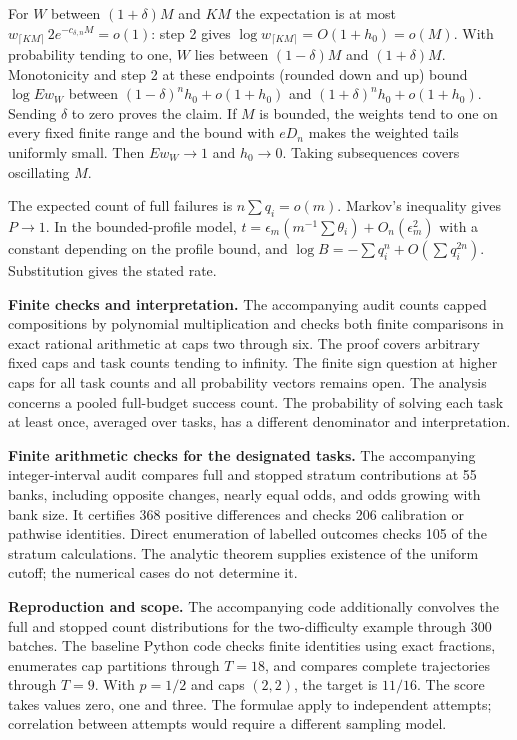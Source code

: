 \documentclass[11pt]{article}
\begin{document}
\newpage
For $W$ between $(1+\delta)M$ and $KM$ the expectation is at most $w_{\lceil KM\rceil}\,2e^{-c_{\delta,n}M}=o(1)$: step 2 gives $\log w_{\lceil KM\rceil}=O(1+h_0)=o(M)$. With probability tending to one, $W$ lies between $(1-\delta)M$ and $(1+\delta)M$. Monotonicity and step 2 at these endpoints (rounded down and up) bound $\log Ew_W$ between $(1-\delta)^n h_0+o(1+h_0)$ and $(1+\delta)^n h_0+o(1+h_0)$. Sending $\delta$ to zero proves the claim. If $M$ is bounded, the weights tend to one on every fixed finite range and the bound with $eD_n$ makes the weighted tails uniformly small. Then $Ew_W\to1$ and $h_0\to0$. Taking subsequences covers oscillating $M$.

The expected count of full failures is $n\sum q_i=o(m)$. Markov's inequality gives $P\to1$. In the bounded-profile model, $t=\epsilon_m(m^{-1}\sum\theta_i)+O_n(\epsilon_m^2)$ with a constant depending on the profile bound, and $\log B=-\sum q_i^n+O(\sum q_i^{2n})$. Substitution gives the stated rate.

\textbf{Finite checks and interpretation.} The accompanying audit counts capped compositions by polynomial multiplication and checks both finite comparisons in exact rational arithmetic at caps two through six. The proof covers arbitrary fixed caps and task counts tending to infinity. The finite sign question at higher caps for all task counts and all probability vectors remains open. The analysis concerns a pooled full-budget success count. The probability of solving each task at least once, averaged over tasks, has a different denominator and interpretation.



\textbf{Finite arithmetic checks for the designated tasks.} The accompanying integer-interval audit compares full and stopped stratum contributions at 55 banks, including opposite changes, nearly equal odds, and odds growing with bank size. It certifies 368 positive differences and checks 206 calibration or pathwise identities. Direct enumeration of labelled outcomes checks 105 of the stratum calculations. The analytic theorem supplies existence of the uniform cutoff; the numerical cases do not determine it.

\textbf{Reproduction and scope.} The accompanying code additionally convolves the full and stopped count distributions for the two-difficulty example through 300 batches. The baseline Python code checks finite identities using exact fractions, enumerates cap partitions through $T=18$, and compares complete trajectories through $T=9$. With $p=1/2$ and caps $(2,2)$, the target is $11/16$. The score takes values zero, one and three. The formulae apply to independent attempts; correlation between attempts would require a different sampling model.
\end{document}
